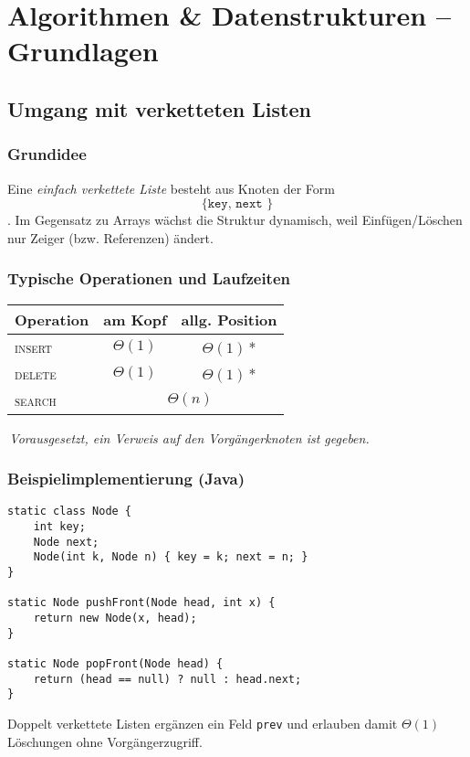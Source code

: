 
\chapter{Algorithmen \& Datenstrukturen – Grundlagen}

\section{Umgang mit verketteten Listen}
\subsection*{Grundidee}
Eine \emph{einfach verkettete Liste} besteht aus Knoten der Form
\[\texttt{\{ key, next \}}\].
Im Gegensatz zu Arrays wächst die Struktur dynamisch, weil Einfügen/Löschen
nur Zeiger (bzw. Referenzen) ändert.

\subsection*{Typische Operationen und Laufzeiten}
\begin{center}
  \renewcommand{\arraystretch}{1.15}
  \begin{tabular}{@{}lcc@{}}
    \textbf{Operation} & \textbf{am Kopf} & \textbf{allg. Position}\\\hline
    \textsc{insert}   & $\Theta(1)$   & $\Theta(1)$\,*\\
    \textsc{delete}   & $\Theta(1)$   & $\Theta(1)$\,*\\
    \textsc{search}   & \multicolumn{2}{c}{$\Theta(n)$}\\
  \end{tabular}
\end{center}
\emph{\small *\,Vorausgesetzt, ein Verweis auf den Vorgängerknoten ist gegeben.}

\subsection*{Beispielimplementierung (Java)}
\begin{verbatim}
static class Node {
    int key;
    Node next;
    Node(int k, Node n) { key = k; next = n; }
}

static Node pushFront(Node head, int x) {
    return new Node(x, head);
}

static Node popFront(Node head) {
    return (head == null) ? null : head.next;
}
\end{verbatim}
Doppelt verkettete Listen ergänzen ein Feld \texttt{prev} und erlauben damit
$\Theta(1)$ Löschungen ohne Vorgängerzugriff.

